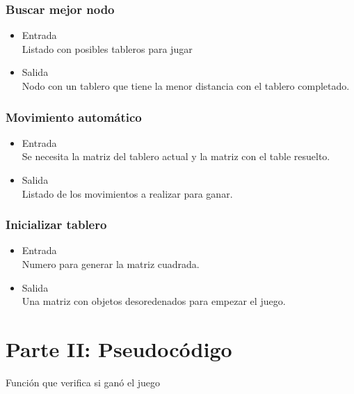 \documentclass{article}
\begin{document}
\subsubsection{Buscar mejor nodo}
\begin{itemize}
    \item Entrada
    \\Listado con posibles tableros para jugar
    \item Salida
    \\Nodo con un tablero que tiene la menor distancia con el tablero completado.
\end{itemize}

\subsubsection{Movimiento automático}
\begin{itemize}
    \item Entrada
    \\Se necesita la matriz del tablero actual y la matriz con el table resuelto.
    \item Salida
    \\Listado de los movimientos a realizar para ganar.
\end{itemize}

\subsubsection{Inicializar tablero}
\begin{itemize}
    \item Entrada
    \\Numero para generar la matriz cuadrada.
    \item Salida
    \\Una matriz con objetos desoredenados para empezar el juego.
\end{itemize}

\section{Parte II: Pseudocódigo}
\begin{algorithm}[H]
\begin{algorithmic}[1]
      \EndIf
    \EndFor
  \EndFor
  \State{}
\EndProcedure
\end{algorithmic}
\caption{Función que verifica si ganó el juego}
\end{algorithm}
\end{document}
